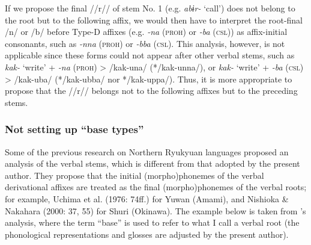 If we propose the final //r// of stem No. 1 (e.g. \textit{abɨr-} ‘call’) does not belong to the root but to the following affix, we would then have to interpret the root-final /n/ or /b/ before Type-D affixes (e.g. \textit{-na} (\textsc{proh}) or \textit{-ba} (\textsc{csl})) as affix-initial consonants, such as \textit{-nna} (\textsc{proh}) or \textit{-bba} (\textsc{csl}). This analysis, however, is not applicable since these forms could not appear after other verbal stems, such as \textit{kak-} ‘write’ + \textit{-na} (\textsc{proh}) > /kak-una/ (*/kak-unna/), or \textit{kak-} ‘write’ + \textit{-ba} (\textsc{csl}) > /kak-uba/ (*/kak-ubba/ nor */kak-uppa/). Thus, it is more appropriate to propose that the //r// belongs not to the following affixes but to the preceding stems.

\subsubsection{Not setting up “base types”}

Some of the previous research on Northern Ryukyuan languages proposed an analysis of the verbal stems, which is different from that adopted by the present author. They propose that the initial (morpho)phonemes of the verbal derivational affixes are treated as the final (morpho)phonemes of the verbal roots; for example, Uchima et al. (1976: 74ff.) for Yuwan (Amami), and Nishioka \& Nakahara (2000: 37, 55) for Shuri (Okinawa). The example below is taken from \citet{UchimaEtAl1976}’s analysis, where the term “base” is used to refer to what I call a verbal root (the phonological representations and glosses are adjusted by the present author).

